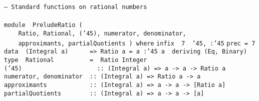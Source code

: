 \noindent\bprogB
\mbox{\tt --\ Standard\ functions\ on\ rational\ numbers}\\
\mbox{\tt }\\
\mbox{\tt module\ \ PreludeRatio\ (}\\
\mbox{\tt \ \ \ \ Ratio,\ Rational,\ ({\char'45}),\ numerator,\ denominator,}\\
\mbox{\tt \ \ \ \ approximants,\ partialQuotients\ )\ where}
\eprogB\noindent\bprogB
\mbox{\tt infix\ \ 7\ \ {\char'45},\ :{\char'45}}
\eprogB\noindent\bprogB
\mbox{\tt prec\ =\ 7}
\eprogB\noindent\bprogB
\mbox{\tt data\ \ (Integral\ a)\ \ \ \ \ \ =>\ Ratio\ a\ =\ a\ :{\char'45}\ a\ \ deriving\ (Eq,\ Binary)}\\
\mbox{\tt type\ \ Rational\ \ \ \ \ \ \ \ \ \ =\ \ Ratio\ Integer}
\eprogB\noindent\bprogB
\mbox{\tt ({\char'45})\ \ \ \ \ \ \ \ \ \ \ \ \ \ \ \ \ \ \ \ \ ::\ (Integral\ a)\ =>\ a\ ->\ a\ ->\ Ratio\ a}\\
\mbox{\tt numerator,\ denominator\ \ ::\ (Integral\ a)\ =>\ Ratio\ a\ ->\ a}\\
\mbox{\tt approximants\ \ \ \ \ \ \ \ \ \ \ \ ::\ (Integral\ a)\ =>\ a\ ->\ a\ ->\ [Ratio\ a]}\\
\mbox{\tt partialQuotients\ \ \ \ \ \ \ \ ::\ (Integral\ a)\ =>\ a\ ->\ a\ ->\ [a]}
